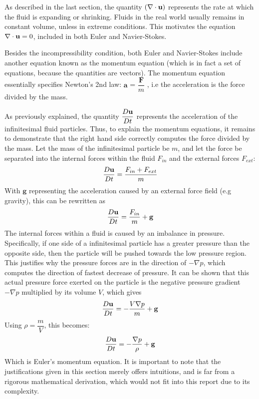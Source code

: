 As described in the last section, the quantity $(\nabla \cdot \textbf{u})$ represents the rate at which the fluid is expanding or shrinking. Fluids in the real world usually remains in constant volume, unless in extreme conditions. This motivates the equation $\nabla \cdot \textbf{u} = 0$, included in both Euler and Navier-Stokes.


Besides the incompressibility condition, both Euler and Navier-Stokes include another equation known as the momentum equation (which is in fact a set of equations, because the quantities are vectors). The momentum equation essentially specifies Newton's 2nd law: $\textbf{a}$ = $\dfrac{\textbf{F}}{m}$ , i.e the acceleration is the force divided by the mass.

As previously explained, the quantity $\dfrac{D\textbf{u}}{Dt}$ represents the acceleration of the infinitesimal fluid particles. Thus, to explain the momentum equations, it remains to demonstrate that the right hand side correctly computes the force divided by the mass. Let the mass of the infinitesimal particle be $m$, and let the force be separated into the internal forces within the fluid $F_{in}$ and the external forces $F_{ext}$:
$$
\dfrac{D\textbf{u}}{Dt} = \frac{F_{in} + F_{ext}}{m}
$$
With $\textbf{g}$ representing the acceleration caused by an external force field (e.g gravity), this can be rewritten as
$$
\dfrac{D\textbf{u}}{Dt} = \frac{F_{in}}{m} + \textbf{g}
$$
The internal forces within a fluid is caused by an imbalance in pressure. Specifically, if one side of a infinitesimal particle has a greater pressure than the opposite side, then the particle will be pushed towards the low pressure region. This justifies why the pressure forces are in the direction of $-\nabla p$, which computes the direction of fastest decrease of pressure. It can be shown that this actual pressure force exerted on the particle is the negative pressure gradient $-\nabla p$ multiplied by its volume $V$, which gives
$$
\dfrac{D\textbf{u}}{Dt} = -\frac{V \nabla p}{m} + \textbf{g}
$$
Using $\rho = \dfrac{m}{V}$, this becomes:
$$
\dfrac{D\textbf{u}}{Dt} =  -\frac{\nabla p}{\rho} + \textbf{g}
$$
Which is Euler's momentum equation. It is important to note that the justifications given in this section merely offers intuitions, and is far from a rigorous mathematical derivation, which would not fit into this report due to its complexity. 


